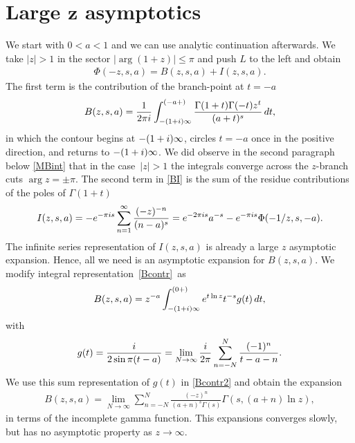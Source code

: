 \documentclass[11pt]{article}
\numberwithin{equation}{section}
\numberwithin{equation}{section}
\def\expe{{\rm e}}
\def\iunit{{\rm i}}
\def\id{\,{\rm d}}
\begin{document}
\section[Large z asymptotics]{Large $\boldsymbol{z}$ asymptotics}\label{Sect:largez}
We start with $0<a<1$ and we can use analytic continuation afterwards.
We take $|z|>1$ in the sector $|\arg(1+z)|\leq\pi$ and push $L$ to the left and obtain
\begin{gather}\label{BI}
 \Phi(-z,s,a)=B(z,s,a)+I(z,s,a).
\end{gather}
The first term is the contribution of the branch-point at $t=-a$
\begin{gather}\label{Bcontr}
 B(z,s,a)=\frac1{2\pi\iunit}\int_{-(1+\iunit)\infty}^{(-a+)}
 \frac{\Gamma(1+t)\Gamma(-t)z^t}{(a+t)^s}\id t,
\end{gather}
in which the contour begins at $-(1+\iunit)\infty$, circles $t=-a$ once in the positive direction,
and returns to $-(1+\iunit)\infty$. We did observe in the second paragraph below \eqref{MBint}
that in the case~$|z|>1$ the integrals converge across the $z$-branch cuts $\arg z=\pm\pi$.
The second term in \eqref{BI} is the sum of the residue contributions of the poles of $\Gamma(1+t)$
\begin{gather}\label{Icontr}
 I(z,s,a)=-\expe^{-\pi\iunit s}\sum_{n=1}^\infty\frac{(-z)^{-n}}{(n-a)^s}
 =\expe^{-2\pi\iunit s}a^{-s}-\expe^{-\pi\iunit s}\Phi (-1/z,s,-a ).
\end{gather}
The infinite series representation of $I(z,s,a)$ is already a large $z$ asymptotic
expansion. Hence, all we need is an asymptotic expansion for $B(z,s,a)$. We
modify integral representation~\eqref{Bcontr}~as%
\begin{gather}\label{Bcontr2}
 B(z,s,a)=z^{-a}\int_{-(1+\iunit)\infty}^{(0+)}
 \expe^{t\ln z} t^{-s}g(t)\id t,
\end{gather}
with
\begin{gather}\label{g}
 g(t)=\frac{\iunit}{2\sin\pi(t-a)}
 =\lim_{N\to\infty} \frac{\iunit}{2\pi}\sum_{n=-N}^N\frac{(-1)^n}{t-a-n}.
\end{gather}
We use this sum representation of $g(t)$ in \eqref{Bcontr2} and obtain the expansion
\begin{gather}\label{Bgamma}
 B(z,s,a)=\lim_{N\to\infty} \sum_{n=-N}^N \frac{(-z)^n}{(a+n)^s\Gamma(s)}
 \Gamma(s,(a+n)\ln z),
\end{gather}
in terms of the incomplete gamma function. This expansions converges slowly, but has no asymptotic
property as $z\to\infty$.
\end{document}
